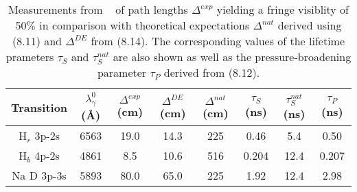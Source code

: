 {   \begin{table}
   \begin{center}
   \begin{tabular}{|c|c c c c c c c|} \hline  
      Transition   & $\lambda_{\gamma}^0$ (\AA)  & $\Delta^{exp}$ (cm)  &  $\Delta^{DE}$ (cm) & $\Delta^{nat}$ (cm) 
    & $\tau_S$ (ns) & $\tau_S^{nat}$ (ns) &  $\tau_P$ (ns)  \\
   \hline 
     H$_r$ 3p-2s & 6563 & 19.0 & 14.3 & 225 & 0.46 & 5.4  & 0.50 \\
    H$_b$ 4p-2s & 4861 & 8.5 & 10.6 & 516 & 0.204 & 12.4 & 0.207 \\
    Na D 3p-3s & 5893 & 80.0 & 65.0 & 225 & 1.92 & 12.4 &  2.98 \\
  \hline
  \end{tabular}
   \caption[] { Measurements from ~\cite{Michelson1} of path lengths $\Delta^{exp}$ yielding a fringe 
    visiblity of 50$\%$ in comparison with theoretical expectations $\Delta^{nat}$ derived using
    (8.11) and $\Delta^{DE}$ from (8.14). The corresponding values of the lifetime
     prameters $\tau_S$ and $\tau_S^{nat}$ are
     also shown as well as the pressure-broadening parameter $\tau_P$ derived from (8.12).} 
  \end{center}
  \end{table} 

}
